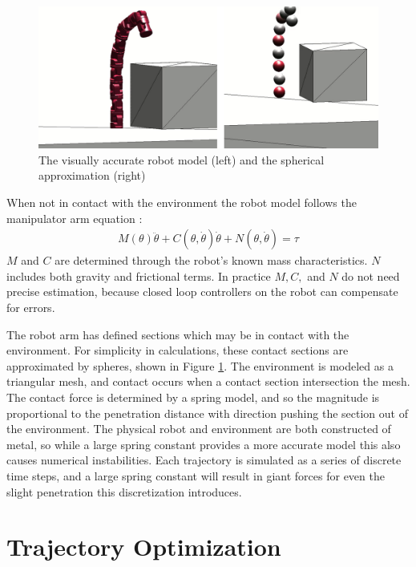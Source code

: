 \documentclass[../thesis.tex]{subfiles}
\begin{document}
\begin{figure}
  \centering
  \includegraphics[width=.7\linewidth]{./Planning/sphere_approxmation.png}
  \caption{The visually accurate robot model (left) and the spherical approximation (right)}
  \label{fig:sphere_approximation}
\end{figure}


When not in contact with the environment the robot model follows the manipulator arm equation \cite{murray1994mathematical}:
\begin{align}
  M(\theta)\ddot \theta + C(\theta, \dot\theta)\dot\theta + N(\theta, \dot\theta) = \tau
\end{align}
$M$ and $C$ are determined through the robot's known mass characteristics.
$N$ includes both gravity and frictional terms.
In practice $M, C,$ and $N$ do not need precise estimation, because closed loop controllers on the robot can compensate for errors.

The robot arm has defined sections which may be in contact with the environment.
For simplicity in calculations, these contact sections are approximated by spheres, shown in Figure \ref{fig:sphere_approximation}.
The environment is modeled as a triangular mesh, and contact occurs when a contact section intersection the mesh.
The contact force is determined by a spring model, and so the magnitude is proportional to the penetration distance with direction pushing the section out of the environment.
The physical robot and environment are both constructed of metal, so while a large spring constant provides a more accurate model this also causes numerical instabilities.
Each trajectory is simulated as a series of discrete time steps, and a large spring constant will result in giant forces for even the slight penetration this discretization introduces.









\section{Trajectory Optimization} \label{sec:trajectory_optimization}
\end{document}
